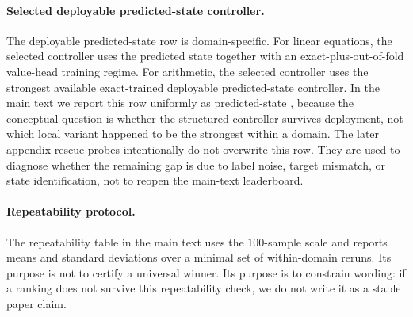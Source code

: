 \paragraph{Selected deployable predicted-state controller.}
The deployable predicted-state row is domain-specific.
For linear equations, the selected controller uses the predicted state together with an exact-plus-out-of-fold value-head training regime.
For arithmetic, the selected controller uses the strongest available exact-trained deployable predicted-state controller.
In the main text we report this row uniformly as predicted-state \triver, because the conceptual question is whether the structured controller survives deployment, not which local variant happened to be the strongest within a domain.
The later appendix rescue probes intentionally do not overwrite this row.
They are used to diagnose whether the remaining gap is due to label noise, target mismatch, or state identification, not to reopen the main-text leaderboard.

\paragraph{Repeatability protocol.}
The repeatability table in the main text uses the \(100\)-sample scale and reports means and standard deviations over a minimal set of within-domain reruns.
Its purpose is not to certify a universal winner.
Its purpose is to constrain wording: if a ranking does not survive this repeatability check, we do not write it as a stable paper claim.
